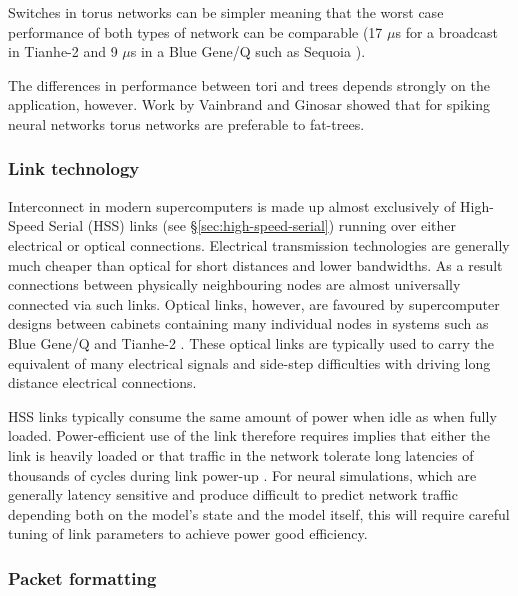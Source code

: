 				Switches in torus networks can be simpler meaning that the worst case
				performance of both types of network can be comparable (17 $\mu$s for a
				broadcast in Tianhe-2 and 9 $\mu$s in a Blue Gene/Q such as Sequoia
				\cite{dongarra13,morozov12}).
				
				The differences in performance between tori and trees depends strongly
				on the application, however. Work by Vainbrand and Ginosar
				\cite{vainbrand11} showed that for spiking neural networks torus
				networks are preferable to fat-trees.
			
			\subsubsection{Link technology}
				
				Interconnect in modern supercomputers is made up almost exclusively of
				High-Speed Serial (HSS) links (see \S\ref{sec:high-speed-serial}) running
				over either electrical or optical connections. Electrical transmission
				technologies are generally much cheaper than optical for short distances
				and lower bandwidths. As a result connections between physically
				neighbouring nodes are almost universally connected via such links.
				Optical links, however, are favoured by supercomputer designs between
				cabinets containing many individual nodes in systems such as Blue Gene/Q
				and Tianhe-2 \cite{dongarra13,prickett10}.  These optical links are
				typically used to carry the equivalent of many electrical signals and
				side-step difficulties with driving long distance electrical
				connections.
				
				HSS links typically consume the same amount of power when idle as when
				fully loaded.  Power-efficient use of the link therefore requires
				implies that either the link is heavily loaded or that traffic in the
				network tolerate long latencies of thousands of cycles during link
				power-up \cite{soteriou03}.  For neural simulations, which are generally
				latency sensitive and produce difficult to predict network traffic
				depending both on the model's state and the model itself, this will
				require careful tuning of link parameters to achieve power good
				efficiency.
				
			
			\subsubsection{Packet formatting}
				
